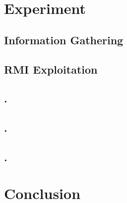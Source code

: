 \documentclass[11pt, a4paper]{report}
\begin{document}
\chapter{Experiment}
\section{Information Gathering}
\section{RMI Exploitation}
\section{.}
\section{.}
\section{.}

\chapter{Conclusion}

% 
%
%
%
\end{document}
